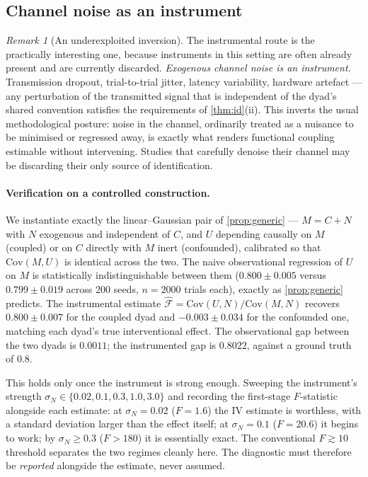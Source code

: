 \documentclass[11pt,a4paper]{article}
\theoremstyle{plain}
\theoremstyle{definition}
\theoremstyle{remark}
\newtheorem{remark}[remark]{Remark}
\newcommand{\Fc}{\mathcal{F}}
\newcommand{\Cov}{\mathrm{Cov}}
\begin{document}
\subsection{Channel noise as an instrument}\label{sec:noise}

\begin{remark}[An underexploited inversion]\label{rem:noise}
The instrumental route is the practically interesting one, because instruments in this setting
are often already present and are currently discarded. \emph{Exogenous channel noise is an
instrument.} Transmission dropout, trial-to-trial jitter, latency variability, hardware
artefact --- any perturbation of the transmitted signal that is independent of the dyad's
shared convention satisfies the requirements of \cref{thm:id}(ii). This inverts the usual
methodological posture: noise in the channel, ordinarily treated as a nuisance to be minimised
or regressed away, is exactly what renders functional coupling estimable without intervening.
Studies that carefully denoise their channel may be discarding their only source of
identification.
\end{remark}

\paragraph{Verification on a controlled construction.}
We instantiate exactly the linear--Gaussian pair of \cref{prop:generic} --- $M = C + N$ with
$N$ exogenous and independent of $C$, and $U$ depending causally on $M$ (coupled) or on $C$
directly with $M$ inert (confounded), calibrated so that $\Cov(M,U)$ is identical across the
two. The naive observational regression of $U$ on $M$ is statistically indistinguishable
between them ($0.800 \pm 0.005$ versus $0.799 \pm 0.019$ across 200 seeds, $n = 2000$ trials
each), exactly as \cref{prop:generic} predicts. The instrumental estimate
$\widehat{\Fc} = \Cov(U,N)/\Cov(M,N)$ recovers $0.800 \pm 0.007$ for the coupled dyad and
$-0.003 \pm 0.034$ for the confounded one, matching each dyad's true interventional effect.
The observational gap between the two dyads is $0.0011$; the instrumented gap is $0.8022$,
against a ground truth of $0.8$.

This holds only once the instrument is strong enough. Sweeping the instrument's strength
$\sigma_N \in \{0.02, 0.1, 0.3, 1.0, 3.0\}$ and recording the first-stage $F$-statistic
alongside each estimate: at $\sigma_N = 0.02$ ($F = 1.6$) the IV estimate is worthless, with a
standard deviation larger than the effect itself; at $\sigma_N = 0.1$ ($F = 20.6$) it begins to
work; by $\sigma_N \ge 0.3$ ($F > 180$) it is essentially exact. The conventional
$F \gtrsim 10$ threshold \citep{stock2005testing} separates the two regimes cleanly here. The
diagnostic must therefore be \emph{reported} alongside the estimate, never assumed.
\end{document}
